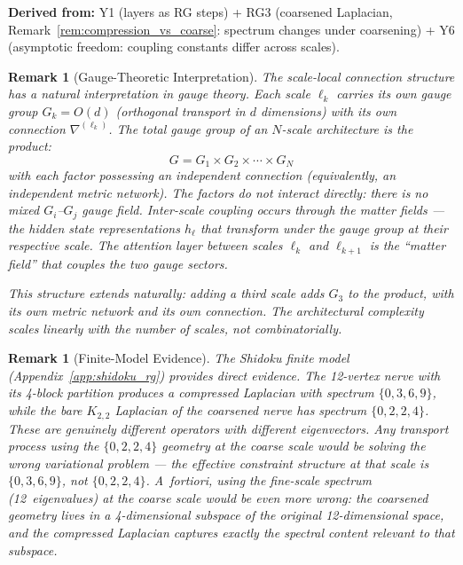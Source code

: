 \documentclass[11pt,letterpaper]{article}
\newtheorem{remark}[conjecture]{Remark}
\begin{document}
\textbf{Derived from:} Y1 (layers as RG steps) + RG3 (coarsened 
Laplacian, Remark~\ref{rem:compression_vs_coarse}: spectrum changes 
under coarsening) + Y6 (asymptotic freedom: coupling constants 
differ across scales).

\begin{remark}[Gauge-Theoretic 
Interpretation]\label{rem:product_gauge}
The scale-local connection structure has a natural interpretation 
in gauge theory. Each scale $\ell_k$ carries its own gauge group 
$G_k = O(d)$ (orthogonal transport in $d$ dimensions) with its own 
connection $\nabla^{(\ell_k)}$. The total gauge group of an 
$N$-scale architecture is the product:
\begin{equation}\label{eq:product_gauge}
    G = G_1 \times G_2 \times \cdots \times G_N
\end{equation}
with each factor possessing an independent connection (equivalently, 
an independent metric network). The factors do not interact 
directly: there is no mixed $G_i$--$G_j$ gauge field. Inter-scale 
coupling occurs through the \emph{matter fields} --- the hidden 
state representations $h_\ell$ that transform under the gauge 
group at their respective scale. The attention layer between 
scales $\ell_k$ and $\ell_{k+1}$ is the ``matter field'' that 
couples the two gauge sectors.

This structure extends naturally: adding a third scale adds 
$G_3$ to the product, with its own metric network and its own 
connection. The architectural complexity scales linearly with the 
number of scales, not combinatorially.
\end{remark}

\begin{remark}[Finite-Model 
Evidence]\label{rem:finite_model_y6a}
The Shidoku finite model (Appendix~\ref{app:shidoku_rg}) provides 
direct evidence. The 12-vertex nerve with its 4-block partition 
produces a compressed Laplacian with spectrum $\{0, 3, 6, 9\}$, 
while the bare $K_{2,2}$ Laplacian of the coarsened nerve has 
spectrum $\{0, 2, 2, 4\}$. These are genuinely different operators 
with different eigenvectors. Any transport process using the 
$\{0, 2, 2, 4\}$ geometry at the coarse scale would be solving 
the wrong variational problem --- the effective constraint 
structure at that scale is $\{0, 3, 6, 9\}$, not $\{0, 2, 2, 4\}$. 
A~fortiori, using the fine-scale spectrum (12~eigenvalues) at the 
coarse scale would be even more wrong: the coarsened geometry lives 
in a 4-dimensional subspace of the original 12-dimensional space, 
and the compressed Laplacian captures exactly the spectral content 
relevant to that subspace.
\end{remark}
\end{document}
